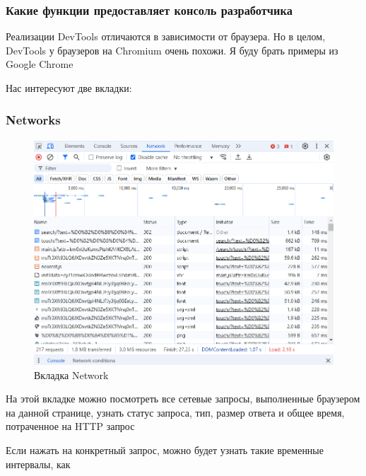 \documentclass[12pt]{article}
\begin{document}
\subsubsection{Какие функции предоставляет консоль разработчика}

Реализации DevTools отличаются в зависимости от браузера.
Но в целом, DevTools у браузеров на Chromium очень похожи.
Я буду брать примеры из Google Chrome

Нас интересуют две вкладки:

\subsubsection{Networks}

\begin{figure}[H]
    \centering
    \includegraphics[width=1\textwidth]{../images/network.png}
    \caption{Вкладка Network}
\end{figure}

На этой вкладке можно посмотреть все сетевые запросы, выполненные браузером на данной странице,
узнать статус запроса, тип, размер ответа и общее время, потраченное на HTTP запрос

Если нажать на конкретный запрос, можно будет узнать такие временные интервалы, как
\end{document}
